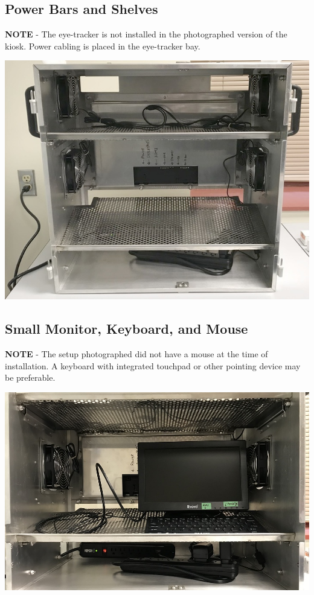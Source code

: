 %
%
\clearpage
\subsection{Power Bars and Shelves}
\label{sect-setup-howto-power}

\textbf{NOTE} - The eye-tracker is not installed in the photographed version
of the kiosk. Power cabling is placed in the eye-tracker bay.

\begin{center}
\includegraphics[width=0.9\columnwidth]
{photos/install-20181106/power.jpg}
\end{center}

%
%
\clearpage
\subsection{Small Monitor, Keyboard, and Mouse}
\label{sect-setup-howto-smallmon}

\textbf{NOTE} - The setup photographed did not have a mouse at the time of
installation. A keyboard with integrated touchpad or other pointing device
may be preferable.

\begin{center}
\includegraphics[width=0.9\columnwidth]
{photos/install-20181106/small-mon.jpg}
\end{center}

